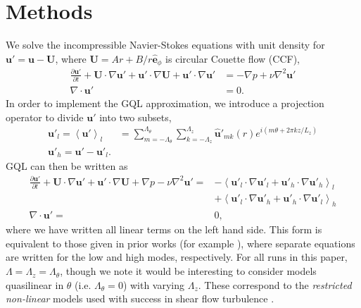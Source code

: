 \documentclass[openacc]{rstransa}%
\begin{document}
\section{Methods}
\label{sec:methods}
We solve the incompressible Navier-Stokes equations with unit density for $\mathbf{u}' = \mathbf{u} - \mathbf{U}$,
where $\mathbf{U} = A r + B/r \hat{\mathbf{e}}_\phi$ is circular Couette flow (CCF),
\begin{align}
\label{eqn:NS}
      \frac{\partial \mathbf{u'}}{\partial t} + \mathbf{U} \cdot \nabla \mathbf{u'} + \mathbf{u'} \cdot \nabla \mathbf{U} + \mathbf{u'} \cdot \nabla \mathbf{u'} &= -\nabla p + \nu \nabla^2\mathbf{u'}\\
      \nabla \cdot \mathbf{u'} &= 0.
\end{align}
In order to implement the GQL approximation, we introduce a projection operator to divide $\mathbf{u'}$ into two subsets,
\begin{align}
    \mathbf{u'}_l = \left< \mathbf{u'}\right>_l &= \sum_{m = -\Lambda_\theta}^{\Lambda_\theta} \sum_{k = -\Lambda_z}^{\Lambda_z} \mathbf{\hat{u}'}_{mk}(r) e^{i (m \theta + 2\pi k z/L_z)}\\
    \mathbf{u'}_h = \mathbf{u'} - \mathbf{u'}_l.
\end{align}
GQL can then be written as 
\begin{align}
\label{eqn:GQL}
      \frac{\partial \mathbf{u'}}{\partial t} + \mathbf{U} \cdot \nabla \mathbf{u'} + \mathbf{u'} \cdot \nabla \mathbf{U} +\nabla p - \nu \nabla^2\mathbf{u'} = &- \left<\mathbf{u'}_l \cdot \nabla \mathbf{u'}_l +\mathbf{u'}_h \cdot \nabla \mathbf{u'}_h\right>_l\\
      & +\left<\mathbf{u'}_l \cdot \nabla \mathbf{u'}_h + \mathbf{u'}_h \cdot \nabla \mathbf{u'}_l \right>_h\\
      \nabla \cdot \mathbf{u'} = & 0,
\end{align}
where we have written all linear terms on the left hand side. This form is equivalent to those given in prior works (for example \cite{2017JFM...810..412T}), where separate equations are written for the low and high modes, respectively.
For all runs in this paper, $\Lambda = \Lambda_z = \Lambda_\theta$, though we note it would be interesting to consider models quasilinear in $\theta$ (i.e. $\Lambda_\theta = 0$) with varying $\Lambda_z$. These correspond to the \emph{restricted non-linear} models used with success in shear flow turbulence \cite{2014PhFl...26j5112T, 2015PhFl...27j5104T, 2015PhFl...27a1702B}.
\end{document}
